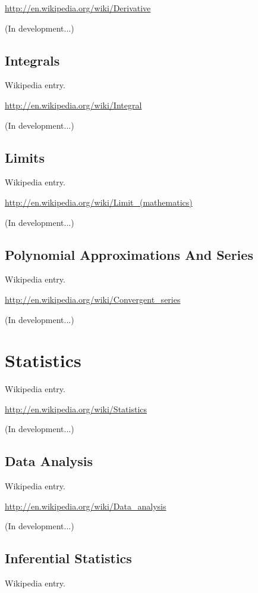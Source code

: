 \documentclass[12pt,twoside]{book}
\begin{document}
\href{http://en.wikipedia.org/wiki/Derivative}{http://en.wikipedia.org/wiki/Derivative}

(In development...)

\subsection[Integrals]{Integrals}
Wikipedia entry.

\href{http://en.wikipedia.org/wiki/Integral}{http://en.wikipedia.org/wiki/Integral}

(In development...)

\subsection[Limits]{Limits}
Wikipedia entry.

\href{http://en.wikipedia.org/wiki/Limit_(mathematics)}{http://en.wikipedia.org/wiki/Limit\_(mathematics)}

(In development...)

\subsection[Polynomial Approximations And Series]{
Polynomial Approximations And Series}
Wikipedia entry.

\href{http://en.wikipedia.org/wiki/Convergent_series}{http://en.wikipedia.org/wiki/Convergent\_series}

(In development...)

\section[Statistics]{Statistics}
Wikipedia entry.

\href{http://en.wikipedia.org/wiki/Statistics}{http://en.wikipedia.org/wiki/Statistics}

(In development...)

\subsection[Data Analysis]{Data Analysis}
Wikipedia entry.

\href{http://en.wikipedia.org/wiki/Data_analysis}{http://en.wikipedia.org/wiki/Data\_analysis}

(In development...)

\subsection[Inferential Statistics]{Inferential
Statistics}
Wikipedia entry.
\end{document}
